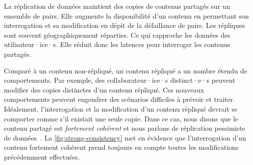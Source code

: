 La réplication de données maintient des copies de contenus partagés sur un ensemble de pairs.
Elle augmente la disponibilité d'un contenu en permettant son interrogation et sa modification en dépit de la défaillance de pairs.
Les répliques sont souvent géographiquement réparties.
Ce qui rapproche les données des utilisateur·ice·s.
Elle réduit donc les latences pour interroger les contenus partagés.

Comparé à un contenu non-répliqué, un contenu répliqué a un nombre étendu de comportements.
Par exemple, des collaborateur·ice·s distinct·e·s peuvent modifier des copies distinctes d'un contenu répliqué.
Ces nouveaux comportements peuvent engendrer des scénarios difficiles à prévoir et traiter.
Idéalement, l'interrogation et la modification d'un contenu répliqué devrait se comporter comme s'il existait une seule copie.
Dans ce cas, nous disons que le contenu partagé est \emph{fortement cohérent} et nous parlons de réplication pessimiste de données~\autocite{saito_2005_optimisticreplication}.
La \autoref{fig:strong-consistency} met en évidence que l'interrogation d'un contenu fortement cohérent prend toujours en compte toutes les modifications précédemment effectuées.

